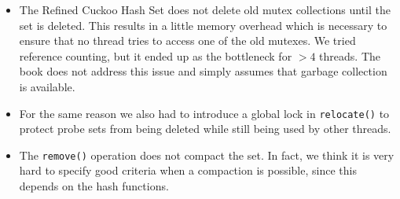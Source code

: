 \documentclass[a4paper,10pt]{article}
\begin{document}
\begin{itemize}
\item The Refined Cuckoo Hash Set does not delete old mutex collections until
    the set is deleted. This results in a little memory overhead which is
    necessary to ensure that no thread tries to access one of the old mutexes.
    We tried reference counting, but it ended up as the bottleneck for $>4$
    threads. The book does not address this issue and simply assumes that
    garbage collection is available.
\item For the same reason we also had to introduce a global lock in
    \lstinline|relocate()| to protect probe sets from being deleted while still
    being used by other threads.
\item The \lstinline|remove()| operation does not compact the set. In fact, we
    think it is very hard to specify good criteria when a compaction is
    possible, since this depends on the hash functions.

\end{itemize}
\end{document}
